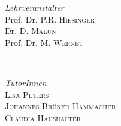 \begin{titlepage}
\vfill

	\begin{minipage}{0.45\textwidth}
		\begin{flushleft}
			\large
			\textit{Lehrveranstalter}\\
			Prof. Dr. P.R. \textsc{Hiesinger}\\ 
			Dr. D. \textsc{Malun}\\ 
			Prof. Dr. M. \textsc{Wernet}
		\end{flushleft}
	\end{minipage}
	~
		\begin{minipage}{0.45\textwidth}
		\begin{flushright}
			
		\end{flushright}
	\end{minipage}
\vfill
	\begin{minipage}{0.7\textwidth}
		\begin{flushleft}
			\large
			\textit{TutorInnen}\\
			\textsc{Lisa Peters}\\
			\textsc{Johannes Brüner Hammacher}\\
			\textsc{Claudia Haushalter}
		\end{flushleft}
	\end{minipage}
	~
		\begin{minipage}{0.2\textwidth}
		\begin{flushright}
			
		\end{flushright}
	\end{minipage}

	
	
	\vfill\vfill\vfill %
	
	
	
	 
	
	\vfill %
	
\end{titlepage}

